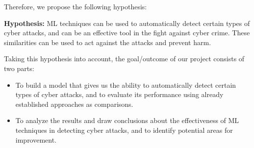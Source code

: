 \nextparagraph
Therefore, we propose the following hypothesis: 
\begin{mdframed}[backgroundcolor=gray!10, linewidth=1pt]
\textbf{Hypothesis:} ML techniques can be used to automatically detect certain types of cyber attacks, and can be an effective tool in the fight against cyber crime. These similarities can be used to act against the attacks and prevent harm. 
\end{mdframed}
Taking this hypothesis into account, the goal/outcome of our project consists of two parts: 
\begin{itemize}
    \item To build a model that gives us the ability to automatically detect certain types of cyber attacks, and to evaluate its performance using already established approaches as comparisons. 
    \item To analyze the results and draw conclusions about the effectiveness of ML techniques in detecting cyber attacks, and to identify potential areas for improvement.
\end{itemize}